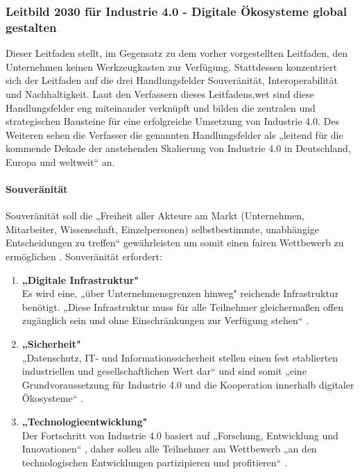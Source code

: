 \subsubsection{Leitbild 2030 für Industrie 4.0 - Digitale Ökosysteme global gestalten}\label{sec:PlattformIndustrieLeitfaden}
Dieser Leitfaden stellt, im Gegensatz zu dem vorher vorgestellten Leitfaden, den Unternehmen keinen Werkzeugkasten zur Verfügung. Stattdessen konzentriert sich der Leitfaden auf die drei Handlungsfelder Souveränität, Interoperabilität und Nachhaltigkeit. Laut den Verfassern dieses Leitfadens,wet sind diese Handlungsfelder eng miteinander verknüpft und bilden die zentralen und strategischen Bausteine für eine erfolgreiche Umsetzung von Industrie 4.0. Des Weiteren sehen die Verfasser die genannten Handlungsfelder als „leitend für die kommende Dekade der anstehenden Skalierung von Industrie 4.0 in Deutschland, Europa und weltweit“ \cite[S.3]{3} an.

\paragraph{Souveränität}\label{sec:Souveränität}
\noindent Souveränität soll die „Freiheit aller Akteure am Markt (Unternehmen, Mitarbeiter, Wissenschaft, Einzelpersonen) selbstbestimmte, unabhängige Entscheidungen zu treffen“ \cite[S.4]{3} gewährleisten um somit einen fairen Wettbewerb zu ermöglichen \cite[S.4]{3}. Souveränität erfordert:
\begin{enumerate}
	\item \textbf{„Digitale Infrastruktur"} \cite[S.4]{3} \\
	Es wird eine, „über Unternehmensgrenzen hinweg" \cite[S.4]{3} reichende	Infrastruktur benötigt. „Diese Infrastruktur muss für alle Teilnehmer gleichermaßen offen zugänglich sein und ohne Einschränkungen zur Verfügung stehen“ \cite[S.4]{3}.
	\item \textbf{„Sicherheit"} \cite[S.4]{3} \\
	„Datenschutz, IT- und Informationssicherheit stellen einen fest etablierten industriellen
	und gesellschaftlichen Wert dar“ \cite[S.4]{3} und sind somit „eine Grundvoraussetzung
	für Industrie 4.0 und die Kooperation innerhalb digitaler Ökosysteme“ \cite[S.4]{3}.
	\item \textbf{„Technologieentwicklung"} \cite[S.4]{3} \\
	Der Fortschritt von Industrie 4.0 basiert auf „Forschung, Entwicklung und Innovationen“ 
	\cite[S.4]{3}, daher sollen alle Teilnehmer am Wettbewerb „an den technologischen 
	Entwicklungen partizipieren und profitieren“ \cite[S.4]{3}.
\end{enumerate}

